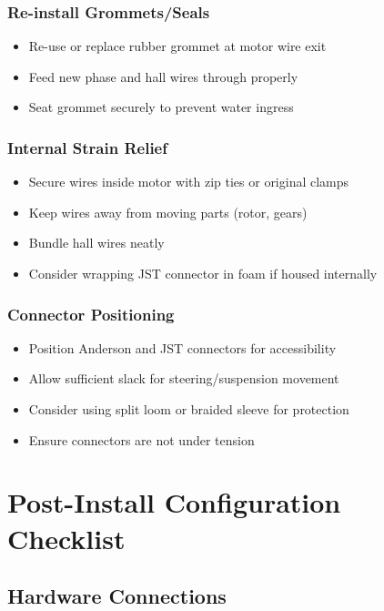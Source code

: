 \documentclass[11pt,a4paper]{article}
\begin{document}
\subsubsection{Re-install Grommets/Seals}
\begin{itemize}
    \item Re-use or replace rubber grommet at motor wire exit
    \item Feed new phase and hall wires through properly
    \item Seat grommet securely to prevent water ingress
\end{itemize}

\subsubsection{Internal Strain Relief}
\begin{itemize}
    \item Secure wires inside motor with zip ties or original clamps
    \item Keep wires away from moving parts (rotor, gears)
    \item Bundle hall wires neatly
    \item Consider wrapping JST connector in foam if housed internally
\end{itemize}

\subsubsection{Connector Positioning}
\begin{itemize}
    \item Position Anderson and JST connectors for accessibility
    \item Allow sufficient slack for steering/suspension movement
    \item Consider using split loom or braided sleeve for protection
    \item Ensure connectors are not under tension
\end{itemize}

\section{Post-Install Configuration Checklist}

\subsection{Hardware Connections}
\end{document}
